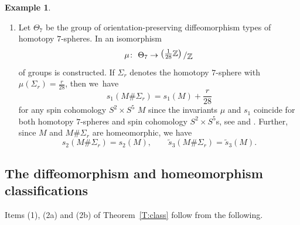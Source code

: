 \documentclass[10pt,a4paper]{amsart}
\numberwithin{equation}{section}
\theoremstyle{definition}
\newtheorem{Example}[Theorem]{Example}
\numberwithin{table}{section}
\newcommand{\Z}{\mathbb{Z}}
\newcommand{\bigslant}[2]{{\raisebox{.2em}{$#1$}\left/\raisebox{-.2em}{$#2$}\right.}}
\newcommand{\ttimes}{\mathrel{\widetilde{\times} }}
\begin{document}
\begin{Example}
\begin{enumerate}
		This shows that $\mathrm{SU}(3)/S^1$ is either diffeomorphic to $S^2\times S^5$ or to $S^5\ttimes S^2$. By \cite[Lemma~4.4]{KS91},\footnote{Note that there is a typo in the formula for $s_3$ in \cite[Lemma~4.4]{KS91}. The correct expression is given by ${s_3(N_{k,l})=\frac{-4P+NS}{6N}}$.} its $s$-invariants are given as follows:
		\[
         s_1\bigl(\mathrm{SU}(3)/S^1\bigr)=s_2\bigl(\mathrm{SU}(3)/S^1\bigr)=0,\qquad \tilde{s}_3\bigl(\mathrm{SU}(3)/S^1\bigr)=\frac{1}{2}.
         \]
		Hence, $\mathrm{SU}(3)/S^1$ is not diffeomorphic to $S^2\times S^5$ and consequently it is diffeomorphic to~\smash{${S^5\ttimes S^2}$}. In particular,
		\[
         s_1\bigl(S^5\ttimes S^2\bigr)=s_2\bigl(S^5\ttimes S^2\bigr)=0,\qquad \tilde{s}_3\bigl(S^5\ttimes S^2\bigr)=\frac{1}{2}.
         \]
		\item[$(3)$] Let $\Theta_7$ be the group of orientation-preserving diffeomorphism types of homotopy $7$-spheres. In \cite{EK62} an isomorphism
		\[
        \mu\colon\ \Theta_7\to\bigslant{\left(\frac{1}{28}\Z\right)}{\Z}
        \]
		of groups is constructed. If $\Sigma_r$ denotes the homotopy $7$-sphere with $\mu(\Sigma_r)=\frac{r}{28}$, then we~have
		\[
         s_1(M\#\Sigma_r)=s_1(M)+\frac{r}{28}
         \]
		for any spin cohomology $S^2\times S^5$ $M$ since the invariants $\mu$ and $s_1$ coincide for both homotopy $7$-spheres and spin cohomology $S^2\times S^5$s, see \cite[Section 3]{KS88} and \cite[Lemma~4]{Xu25}. Further, since $M$ and $M\#\Sigma_r$ are homeomorphic, we have
		\[
         s_2(M\#\Sigma_r)=s_2(M),\qquad \tilde{s}_3(M\#\Sigma_r)=\tilde{s}_3(M).
         \]
	\end{enumerate}
\end{Example}

\subsection{The diffeomorphism and homeomorphism classifications}

Items (1), (2a) and (2b) of Theorem~\ref{T:class} follow from the following.
\end{document}
